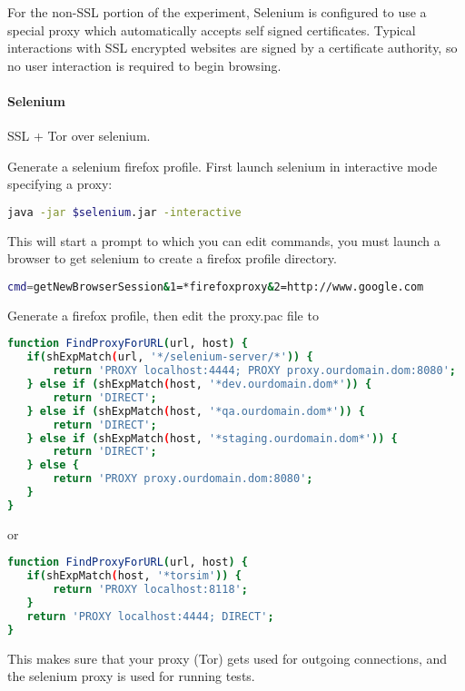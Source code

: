 For the non-SSL portion of the experiment, Selenium is configured to use a
special proxy which automatically accepts self signed certificates. Typical
interactions with SSL encrypted websites are signed by a certificate authority,
so no user interaction is required to begin browsing.

\paragraph{Selenium}

SSL + Tor over selenium. 

Generate a selenium firefox profile. First launch selenium in interactive mode
specifying a proxy:

\begin{lstlisting}[language=sh]
java -jar $selenium.jar -interactive
\end{lstlisting}

This will start a prompt to which you can edit commands, you must launch a
browser to get selenium to create a firefox profile directory.

\begin{lstlisting}[language=sh]
cmd=getNewBrowserSession&1=*firefoxproxy&2=http://www.google.com
\end{lstlisting}

Generate a firefox profile, then edit the proxy.pac file to 

\begin{lstlisting}[language=sh]
function FindProxyForURL(url, host) {
   if(shExpMatch(url, '*/selenium-server/*')) {
       return 'PROXY localhost:4444; PROXY proxy.ourdomain.dom:8080';
   } else if (shExpMatch(host, '*dev.ourdomain.dom*')) {
       return 'DIRECT';
   } else if (shExpMatch(host, '*qa.ourdomain.dom*')) {
       return 'DIRECT';
   } else if (shExpMatch(host, '*staging.ourdomain.dom*')) {
       return 'DIRECT';
   } else {
       return 'PROXY proxy.ourdomain.dom:8080';
   }
}
\end{lstlisting}

or

\begin{lstlisting}[language=sh]
function FindProxyForURL(url, host) {
   if(shExpMatch(host, '*torsim')) {
       return 'PROXY localhost:8118';
   }
   return 'PROXY localhost:4444; DIRECT';
}
\end{lstlisting}

This makes sure that your proxy (Tor) gets used for outgoing connections, and
the selenium proxy is used for running tests.

